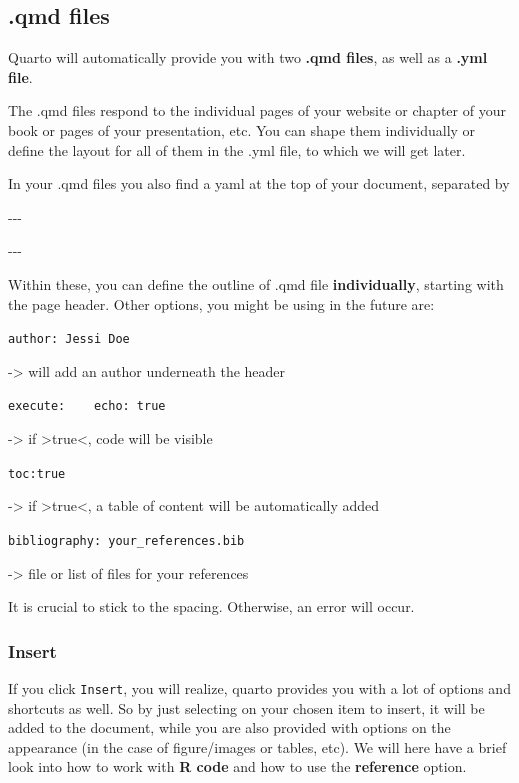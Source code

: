 \documentclass[
  letterpaper,
  DIV=11,
  numbers=noendperiod]{scrreprt}
\begin{document}
\hypertarget{qmd-files}{%
\subsection{.qmd files}\label{qmd-files}}

Quarto will automatically provide you with two \textbf{.qmd files}, as
well as a \textbf{.yml file}.

The .qmd files respond to the individual pages of your website or
chapter of your book or pages of your presentation, etc. You can shape
them individually or define the layout for all of them in the .yml file,
to which we will get later.

In your .qmd files you also find a yaml at the top of your document,
separated by

-\/-\/-

-\/-\/-

Within these, you can define the outline of .qmd file
\textbf{individually}, starting with the page header. Other options, you
might be using in the future are:

\texttt{author:\ Jessi\ Doe}

-\textgreater{} will add an author underneath the header

\texttt{execute:\ \ \ \ echo:\ true}

-\textgreater{} if \textgreater true\textless, code will be visible

\texttt{toc:true}

-\textgreater{} if \textgreater true\textless, a table of content will
be automatically added

\texttt{bibliography:\ your\_references.bib}

-\textgreater{} file or list of files for your references

It is crucial to stick to the spacing. Otherwise, an error will occur.

\hypertarget{insert}{%
\subsubsection{Insert}\label{insert}}

If you click \texttt{Insert}, you will realize, quarto provides you with
a lot of options and shortcuts as well. So by just selecting on your
chosen item to insert, it will be added to the document, while you are
also provided with options on the appearance (in the case of
figure/images or tables, etc). We will here have a brief look into how
to work with \textbf{R code} and how to use the \textbf{reference}
option.
\end{document}
